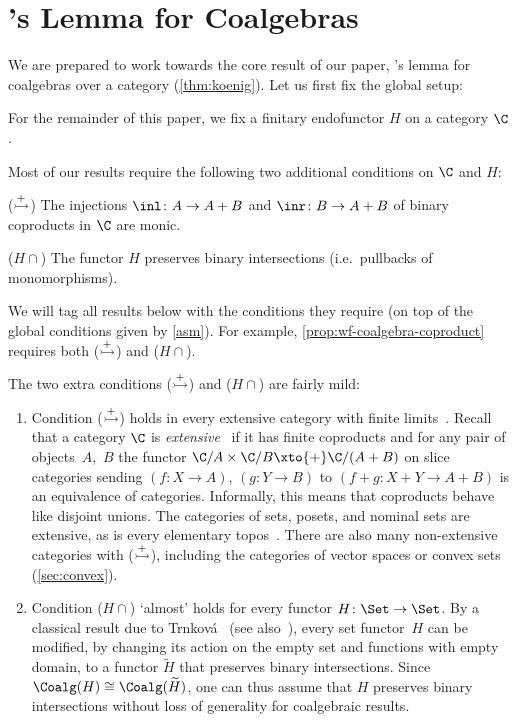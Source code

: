 \documentclass[a4paper,UKenglish, autoref, numberwithinsect, final]{lipics-v2021}
\numberwithin{equation}{section}
\newcommand{\injmono}{\ensuremath{\overset{\smash{\raisebox{-1pt}{\ensuremath{\scriptstyle+}}}}{\rightarrowtail}}}%
\newcommand{\hpresint}{\ensuremath{H\cap}\xspace}
\theoremstyle{plain}
\theoremstyle{definition}
\begin{document}
\section{\Konig's Lemma for Coalgebras}\label{sec:konig}
We are prepared to work towards the core result of our paper, \Konig's lemma for coalgebras over a \lfp category (\autoref{thm:koenig}). Let us first fix the global setup:

\begin{assumption}\label{asm}
For the remainder of this paper, we fix a finitary endofunctor $H$ on a \lfplong category $\C$. 
\end{assumption}
Most of our results require the following two additional conditions on $\C$ and $H$:

\medskip\noindent (\injmono) The injections $\inl\colon A\to A+B$ and $\inr\colon B\to A+B$ of binary coproducts in $\C$ are monic.

\medskip\noindent (\hpresint) The functor $H$ preserves binary intersections (i.e.\ pullbacks of monomorphisms).

\medskip\noindent We will tag all results below with the conditions they require (on top of the global conditions given by \autoref{asm}). For example, \autoref{prop:wf-coalgebra-coproduct} requires both (\injmono) and (\hpresint).

\begin{rem}\label{rem:conditions}
The two extra conditions (\injmono) and (\hpresint) are fairly mild:
\begin{enumerate}
\item Condition (\injmono) holds in every extensive category with finite limits~\cite[Prop.~3.3]{cw93}. Recall that a category $\C$ is \emph{extensive}~\cite{cw93} if it has finite coproducts and for any pair of objects~$A$,~$B$ the functor $\C/A\times \C/B \xto{+} \C/(A+B)$ on slice categories sending $(f\colon X\to A)$, $(g\colon Y\to B)$ to $(f+g\colon X+Y\to A+B)$ is an equivalence of categories. Informally, this means that coproducts behave like disjoint unions. The categories of sets, posets, and nominal sets are extensive, as is every elementary topos~\cite{Johnstone}. There are also many non-extensive categories with (\injmono), including the categories of vector spaces or convex sets (\autoref{sec:convex}).
\item\label{rem:conditions:set-func-pres-int} Condition (\hpresint) `almost' holds for every functor $H\colon \Set\to \Set$. By a classical result due to Trnkov\'a~\cite{trnkova71} (see also~\cite[Prop.~8.1.13]{amm25}), every set functor~$H$ can be modified, by changing its action on the empty set and functions with empty domain, to a functor $\widetilde{H}$ that preserves binary intersections. Since $\Coalg(H)\cong \Coalg(\widetilde{H})$, one can thus assume that $H$ preserves binary intersections without loss of generality for coalgebraic results.
\end{enumerate} 
\end{rem}
\end{document}
